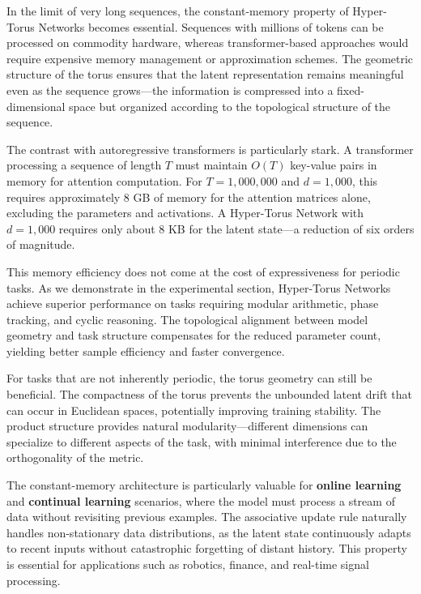 \documentclass[12pt,letterpaper,twoside]{article}
\begin{document}
In the limit of very long sequences, the constant-memory property of Hyper-Torus Networks becomes essential. Sequences with millions of tokens can be processed on commodity hardware, whereas transformer-based approaches would require expensive memory management or approximation schemes. The geometric structure of the torus ensures that the latent representation remains meaningful even as the sequence grows—the information is compressed into a fixed-dimensional space but organized according to the topological structure of the sequence.

The contrast with autoregressive transformers is particularly stark. A transformer processing a sequence of length $T$ must maintain $O(T)$ key-value pairs in memory for attention computation. For $T=1,000,000$ and $d=1,000$, this requires approximately 8 GB of memory for the attention matrices alone, excluding the parameters and activations. A Hyper-Torus Network with $d=1,000$ requires only about 8 KB for the latent state—a reduction of six orders of magnitude.

This memory efficiency does not come at the cost of expressiveness for periodic tasks. As we demonstrate in the experimental section, Hyper-Torus Networks achieve superior performance on tasks requiring modular arithmetic, phase tracking, and cyclic reasoning. The topological alignment between model geometry and task structure compensates for the reduced parameter count, yielding better sample efficiency and faster convergence.

For tasks that are not inherently periodic, the torus geometry can still be beneficial. The compactness of the torus prevents the unbounded latent drift that can occur in Euclidean spaces, potentially improving training stability. The product structure provides natural modularity—different dimensions can specialize to different aspects of the task, with minimal interference due to the orthogonality of the metric.

The constant-memory architecture is particularly valuable for \textbf{online learning} and \textbf{continual learning} scenarios, where the model must process a stream of data without revisiting previous examples. The associative update rule naturally handles non-stationary data distributions, as the latent state continuously adapts to recent inputs without catastrophic forgetting of distant history. This property is essential for applications such as robotics, finance, and real-time signal processing.
\end{document}
